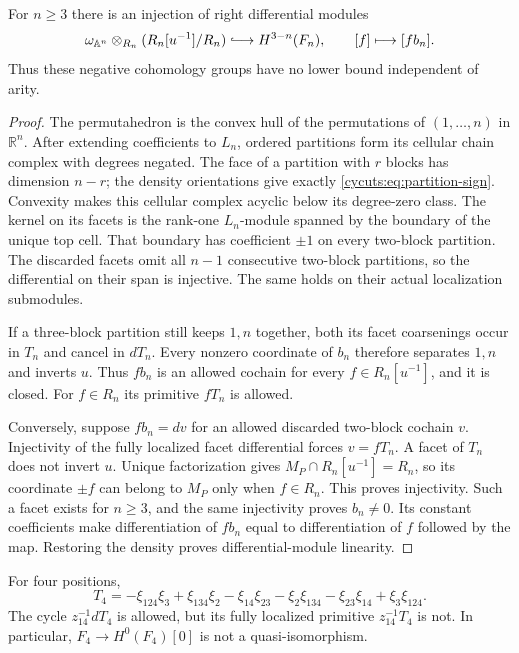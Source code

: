 \begin{theorem}\label{cycuts:thm:outer}
For $n\ge3$ there is an injection of right differential modules
\begin{equation}\label{cycuts:eq:outer-injection}
 \omega_{\mathbb A^n}\otimes_{R_n}(R_n[u^{-1}]/R_n)
 \lhook\joinrel\longrightarrow H^{3-n}(F_n),
 \qquad [f]\longmapsto[fb_n].
\end{equation}
Thus these negative cohomology groups have no lower bound independent
of arity.
\end{theorem}
\begin{proof}
The permutahedron is the convex hull of the permutations of
$(1,\ldots,n)$ in $\mathbb R^n$. After extending coefficients to $L_n$,
ordered partitions form its cellular chain complex with degrees negated.
The face of a partition with $r$ blocks has dimension $n-r$;
the density orientations give exactly
\eqref{cycuts:eq:partition-sign}. Convexity makes this cellular
complex acyclic below its degree-zero class. The kernel on its
facets is the rank-one $L_n$-module spanned by the boundary of the unique top cell.
That boundary has coefficient $\pm1$ on every two-block partition.
The discarded facets omit all $n-1$ consecutive two-block partitions,
so the differential on their span is injective. The same holds on
their actual localization submodules.

If a three-block partition still keeps $1,n$ together, both its
facet coarsenings occur in $T_n$ and cancel in $dT_n$. Every nonzero
coordinate of $b_n$ therefore separates $1,n$ and inverts $u$.
Thus $fb_n$ is an allowed cochain for every $f\in R_n[u^{-1}]$,
and it is closed. For $f\in R_n$ its primitive $fT_n$ is allowed.

Conversely, suppose $fb_n=dv$ for an allowed discarded two-block
cochain $v$. Injectivity of the fully localized facet differential
forces $v=fT_n$. A facet of $T_n$ does not invert $u$. Unique
factorization gives $M_P\cap R_n[u^{-1}]=R_n$, so its coordinate
$\pm f$ can belong to $M_P$ only when $f\in R_n$. This proves
injectivity. Such a facet exists for $n\ge3$, and the same
injectivity proves $b_n\ne0$. Its constant coefficients make
differentiation of $fb_n$ equal to differentiation of $f$ followed
by the map. Restoring the density proves differential-module linearity.
\end{proof}

For four positions,
\begin{equation}\label{cycuts:eq:T4}
 T_4=-\xi_{124}\xi_3+\xi_{134}\xi_2-\xi_{14}\xi_{23}
     -\xi_2\xi_{134}-\xi_{23}\xi_{14}+\xi_3\xi_{124}.
\end{equation}
The cycle $z_{14}^{-1}dT_4$ is allowed, but its fully localized
primitive $z_{14}^{-1}T_4$ is not. In particular,
$F_4\to H^0(F_4)[0]$ is not a quasi-isomorphism.

